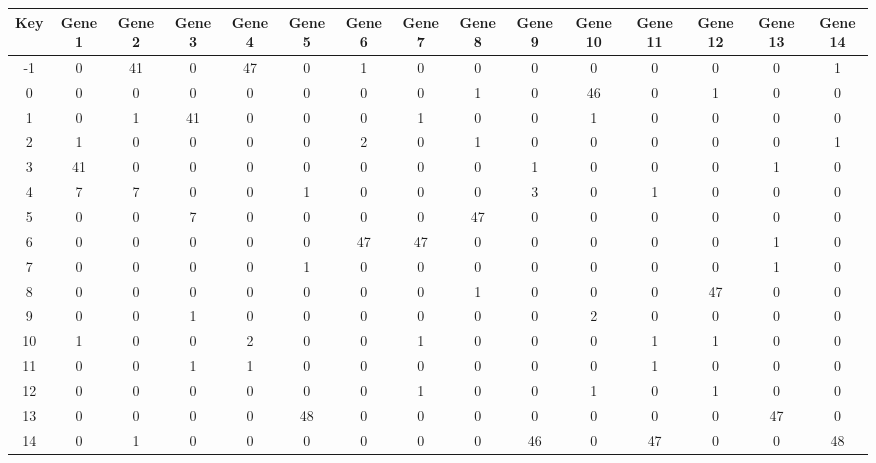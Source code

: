 \begin{tabular}{|c|c|c|c|c|c|c|c|c|c|c|c|c|c|c|}
\hline
Key & Gene 1 & Gene 2 & Gene 3 & Gene 4 & Gene 5 & Gene 6 & Gene 7 & Gene 8 & Gene 9 & Gene 10 & Gene 11 & Gene 12 & Gene 13 & Gene 14 \\
\hline
-1 & 0 & 41 & 0 & 47 & 0 & 1 & 0 & 0 & 0 & 0 & 0 & 0 & 0 & 1 \\
0 & 0 & 0 & 0 & 0 & 0 & 0 & 0 & 1 & 0 & 46 & 0 & 1 & 0 & 0 \\
1 & 0 & 1 & 41 & 0 & 0 & 0 & 1 & 0 & 0 & 1 & 0 & 0 & 0 & 0 \\
2 & 1 & 0 & 0 & 0 & 0 & 2 & 0 & 1 & 0 & 0 & 0 & 0 & 0 & 1 \\
3 & 41 & 0 & 0 & 0 & 0 & 0 & 0 & 0 & 1 & 0 & 0 & 0 & 1 & 0 \\
4 & 7 & 7 & 0 & 0 & 1 & 0 & 0 & 0 & 3 & 0 & 1 & 0 & 0 & 0 \\
5 & 0 & 0 & 7 & 0 & 0 & 0 & 0 & 47 & 0 & 0 & 0 & 0 & 0 & 0 \\
6 & 0 & 0 & 0 & 0 & 0 & 47 & 47 & 0 & 0 & 0 & 0 & 0 & 1 & 0 \\
7 & 0 & 0 & 0 & 0 & 1 & 0 & 0 & 0 & 0 & 0 & 0 & 0 & 1 & 0 \\
8 & 0 & 0 & 0 & 0 & 0 & 0 & 0 & 1 & 0 & 0 & 0 & 47 & 0 & 0 \\
9 & 0 & 0 & 1 & 0 & 0 & 0 & 0 & 0 & 0 & 2 & 0 & 0 & 0 & 0 \\
10 & 1 & 0 & 0 & 2 & 0 & 0 & 1 & 0 & 0 & 0 & 1 & 1 & 0 & 0 \\
11 & 0 & 0 & 1 & 1 & 0 & 0 & 0 & 0 & 0 & 0 & 1 & 0 & 0 & 0 \\
12 & 0 & 0 & 0 & 0 & 0 & 0 & 1 & 0 & 0 & 1 & 0 & 1 & 0 & 0 \\
13 & 0 & 0 & 0 & 0 & 48 & 0 & 0 & 0 & 0 & 0 & 0 & 0 & 47 & 0 \\
14 & 0 & 1 & 0 & 0 & 0 & 0 & 0 & 0 & 46 & 0 & 47 & 0 & 0 & 48 \\
\hline
\end{tabular}